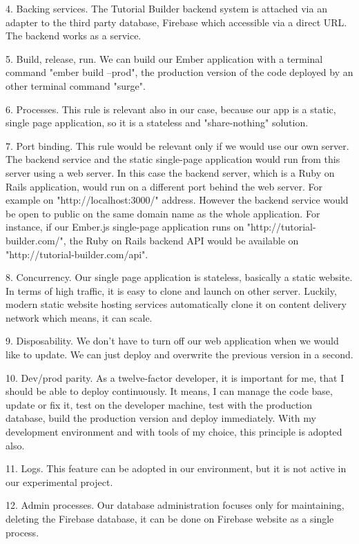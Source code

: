 \documentclass[12pt, a4paper, oneside, openright, medskipamount]{report}
\begin{document}
4. Backing services. The Tutorial Builder backend system is attached via an adapter to the third party database, Firebase which accessible via a direct URL. The backend works as a service.

5. Build, release, run. We can build our Ember application with a terminal command "ember build --prod", the production version of the code deployed by an other terminal command "surge".

6. Processes. This rule is relevant also in our case, because our app is a static, single page application, so it is a stateless and "share-nothing" solution.

7. Port binding. This rule would be relevant only if we would use our own server. The backend service and the static single-page application would run from this server using a web server. In this case the backend server, which is a Ruby on Rails application, would run on a different port behind the web server. For example on "http://localhost:3000/" address. However the backend service would be open to public on the same domain name as the whole application. For instance, if our Ember.js single-page application runs on "http://tutorial-builder.com/", the Ruby on Rails backend API would be available on "http://tutorial-builder.com/api".

8. Concurrency. Our single page application is stateless, basically a static website. In terms of high traffic, it is easy to clone and launch on other server. Luckily, modern static website hosting services automatically clone it on content delivery network which means, it can scale.

9. Disposability. We don't have to turn off our web application when we would like to update. We can just deploy and overwrite the previous version in a second.

10. Dev/prod parity. As a twelve-factor developer, it is important for me, that I should be able to deploy continuously. It means, I can manage the code base, update or fix it, test on the developer machine, test with the production database, build the production version and deploy immediately. With my development environment and with tools of my choice, this principle is adopted also.

11. Logs. This feature can be adopted in our environment, but it is not active in our experimental project.

12. Admin processes. Our database administration focuses only for maintaining, deleting the Firebase database, it can be done on Firebase website as a single process.
\end{document}
